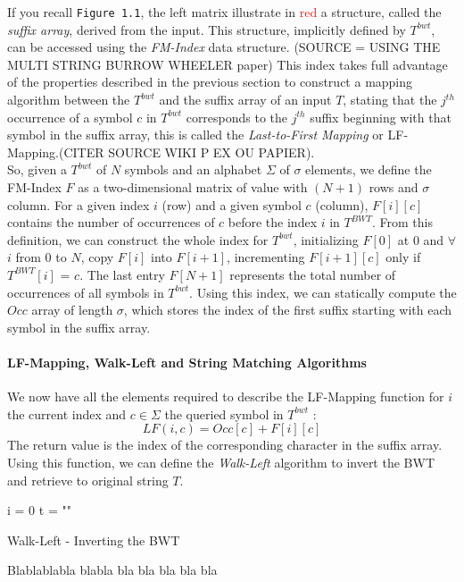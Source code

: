 If you recall \texttt{Figure 1.1}, the left matrix illustrate in \textcolor{red}{red} a structure, called the \textit{suffix array}, derived from the input. This structure, implicitly defined by $T^{bwt}$, can be accessed using the \textsl{FM-Index} data structure. (SOURCE = USING THE MULTI STRING BURROW WHEELER paper) This index takes full advantage of the properties described in the previous section to construct a mapping algorithm between the $T^{bwt}$ and the suffix array of an input $T$, stating that the $j^{th}$ occurrence of a symbol $c$ in $T^{bwt}$ corresponds to the $j^{th}$ suffix beginning with that symbol in the suffix array, this is called the \textsl{Last-to-First Mapping} or LF-Mapping.(CITER SOURCE WIKI P EX OU PAPIER). \\
So, given a $T^{bwt}$ of $N$ symbols and an alphabet $\Sigma$ of $\sigma$ elements, we define the FM-Index $F$ as a two-dimensional matrix of value with $(N + 1)$ rows and $\sigma$ column. For a given index $i$ (row) and a given symbol $c$ (column), $F[i][c]$ contains the number of occurrences of $c$ before the index $i$ in $T^{BWT}$. From this definition, we can construct the whole index for $T^{bwt}$, initializing $F[0]$ at $0$ and $\forall$ $i$ from $0$ to $N$, copy $F[i]$ into $F[i+1]$, incrementing $F[i+1][c]$ only if $T^{BWT}[i]$ = $c$. The last entry $F[N + 1]$ represents the total number of occurrences of all symbols in $T^{bwt}$. Using this index, we can statically compute the $Occ$ array of length $\sigma$, which stores the index of the first suffix starting with each symbol in the suffix array.

\paragraph{LF-Mapping, Walk-Left and String Matching Algorithms}
We now have all the elements required to describe the LF-Mapping function for $i$ the current index and $c \in \Sigma$ the queried symbol in $T^{bwt}$  : 
\begin{equation*}
LF(i, c) = Occ[c] + F[i][c]
\end{equation*}
The return value is the index of the corresponding character in the suffix array. \\
Using this function, we can define the \textsl{Walk-Left} algorithm to invert the BWT and retrieve to original string $T$. \\

\begin{minipage}[t]{0.55\textwidth}
\begin{algorithm}[H]
	\SetAlgoLined
	i = 0\;
	t = ""\;
\caption{Walk-Left - Inverting the BWT}
\end{algorithm}
\end{minipage}
\hspace{3mm}
\begin{minipage}[t]{0.3\textwidth}
Blablablabla blabla bla bla bla bla bla
\end{minipage}
\vspace*{5mm}

